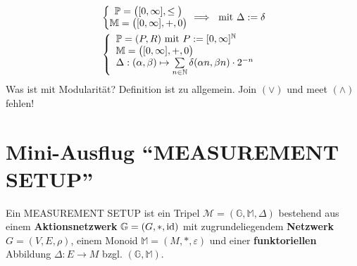 \begin{beispiel}
\begin{align*}
&\left\lbrace\begin{matrix}
\mathbb{P}=\big([0,\infty],\leq\big)\\
\mathbb{M}=\big([0,\infty],+,0\big)
\end{matrix}\right.\implies \text{ mit }\Delta:=\delta\\
&\left\lbrace\begin{array}{l}
\mathbb{P}=(P,R)\text{ mit } P:=[0,\infty]^{\mathbb{N}}\\
\mathbb{M}=\big([0,\infty],+,0\big)\\
\Delta:(\alpha,\beta)\mapsto\sum\limits_{n\in\mathbb{N}}\delta(\alpha n,\beta n)\cdot 2^{-n}
\end{array}\right.
\end{align*}
Was ist mit Modularität? Definition ist zu allgemein. Join $(\vee)$ und meet $(\wedge)$ fehlen!
\end{beispiel}

\section{Mini-Ausflug ``MEASUREMENT SETUP''}
\begin{definition}
Ein MEASUREMENT SETUP ist ein Tripel $\mathcal{M}=(\mathbb{G},\mathbb{M},\Delta)$ bestehend aus einem \textbf{Aktionsnetzwerk} $\mathbb{G}=(G,\ast,\operatorname{id})$ mit zugrundeliegendem \textbf{Netzwerk} $G=(V,E,\rho)$, einem Monoid $\mathbb{M}=(M,\ast,\varepsilon)$ und einer \textbf{funktoriellen} Abbildung $\Delta:E\to M$ bzgl. $(\mathbb{G},\mathbb{M})$.
\end{definition}

